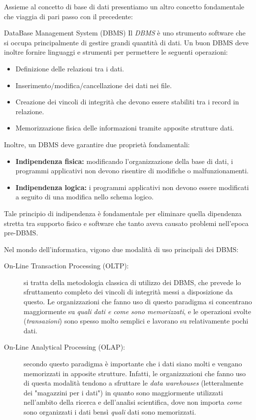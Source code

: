 \documentclass[12pt]{report}
\begin{document}
	Assieme al concetto di base di dati presentiamo un altro concetto fondamentale che viaggia di pari passo con il precedente:
	\begin{definizione}{DataBase Management System (DBMS)}{}
		Il \textit{DBMS} è uno strumento software che si occupa principalmente di gestire grandi quantità di dati.
		Un buon DBMS deve inoltre fornire linguaggi e strumenti per permettere le seguenti operazioni:
		\begin{itemize}
			\item Definizione delle relazioni tra i dati.
			
			\item Inserimento/modifica/cancellazione dei dati nei file.
			
			\item Creazione dei vincoli di integrità che devono essere stabiliti tra i record in relazione.
			
			\item Memorizzazione fisica delle informazioni tramite apposite strutture dati.
		\end{itemize}
		
		Inoltre, un DBMS deve garantire due proprietà fondamentali:
		\begin{itemize}
			\item \textbf{Indipendenza fisica:} modificando l'organizzazione della base di dati, i programmi applicativi non devono risentire di modifiche o malfunzionamenti.
			
			\item \textbf{Indipendenza logica:} i programmi applicativi non devono essere modificati a seguito di una modifica nello schema logico.
		\end{itemize}
		Tale principio di indipendenza è fondamentale per eliminare quella dipendenza stretta tra supporto fisico e software che tanto aveva causato problemi nell'epoca pre-DBMS.
	\end{definizione}
	
	Nel mondo dell'informatica, vigono due modalità di uso principali dei DBMS:
	\begin{description}
		\item [On-Line Transaction Processing (OLTP):] si tratta della metodologia classica di utilizzo dei DBMS, che prevede lo sfruttamento completo dei vincoli di integrità messi a disposizione da questo. Le organizzazioni che fanno uso di questo paradigma si concentrano maggiormente su \textit{quali dati e come sono memorizzati}, e le operazioni svolte (\textit{transazioni}) sono spesso molto semplici e lavorano su relativamente pochi dati.
		
		\item [On-Line Analytical Processing (OLAP):] secondo questo paradigma è importante che i dati siano molti e vengano memorizzati in apposite strutture. Infatti, le organizzazioni che fanno uso di questa modalità tendono a sfruttare le \textit{data warehouses} (letteralmente dei "magazzini per i dati") in quanto sono maggiormente utilizzati nell'ambito della ricerca e dell'analisi scientifica, dove non importa \textit{come} sono organizzati i dati bensì \textit{quali} dati sono memorizzati.
	\end{description}
	
\end{document}
